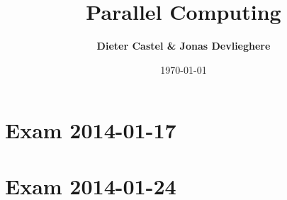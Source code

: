 \documentclass[a4paper, 10pt, oneside]{article}
\title{Parallel Computing}
\date{\today}
\author{\textbf{Dieter Castel \& Jonas Devlieghere}}
\theoremstyle{definition}
\begin{document}
\maketitle
\newpage

\tableofcontents
\newpage

\section{Exam 2014-01-17}


\newpage
\section{Exam 2014-01-24}


\newpage
\appendix
\nocite{*}
\printbibliography
\end{document}
